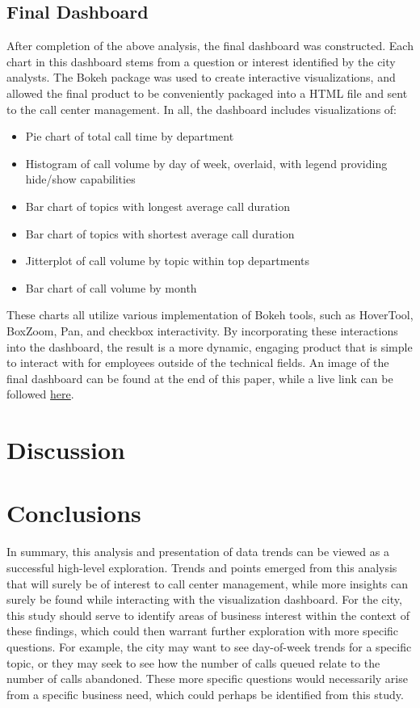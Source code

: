 \documentclass[11pt,twocolumn]{article}
\begin{document}
	\subsection{Final Dashboard}

After completion of the above analysis, the final dashboard was constructed.  Each chart in this dashboard stems from a question or interest identified by the city analysts.  The Bokeh package was used to create interactive visualizations, and allowed the final product to be conveniently packaged into a HTML file and sent to the call center management.  In all, the dashboard includes visualizations of:

\begin{itemize}
  \item{Pie chart of total call time by department}
  \item{Histogram of call volume by day of week, overlaid, with legend providing hide/show capabilities}
  \item{Bar chart of topics with longest average call duration}
  \item{Bar chart of topics with shortest average call duration}
  \item{Jitterplot of call volume by topic within top departments}
  \item{Bar chart of call volume by month}
\end{itemize}

These charts all utilize various implementation of Bokeh tools, such as HoverTool, BoxZoom, Pan, and checkbox interactivity.  By incorporating these interactions into the dashboard, the result is a more dynamic, engaging product that is simple to interact with for employees outside of the technical fields.  An image of the final dashboard can be found at the end of this paper, while a live link can be followed \href{https://jdbul33.github.io/311_Call_Dashboard.html}{here}.


\section{Discussion}


\section{Conclusions}

In summary, this analysis and presentation of data trends can be viewed as a successful high-level exploration.  Trends and points emerged from this analysis that will surely be of interest to call center management, while more insights can surely be found while interacting with the visualization dashboard.  For the city, this study should serve to identify areas of business interest within the context of these findings, which could then warrant further exploration with more specific questions.  For example, the city may want to see day-of-week trends for a specific topic, or they may seek to see how the number of calls queued relate to the number of calls abandoned.  These more specific questions would necessarily arise from a specific business need, which could perhaps be identified from this study.
\end{document}
